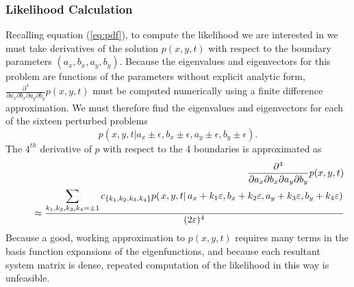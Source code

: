 \documentclass[10pt]{article}
\begin{document}
\subsubsection{Likelihood Calculation} \label{sec:likelihood-calc}
Recalling equation (\ref{eq:pdf}), to compute the likelihood we are
interested in we must take derivatives of the solution $p(x,y,t)$ with
respect to the boundary parameters $(a_x, b_x, a_y, b_y)$. Because the
eigenvalues and eigenvectors for this problem are functions of the
parameters without explicit analytic form,
$\frac{\partial^4}{\partial a_x\partial b_x \partial a_y \partial
  b_y}p(x,y,t)$ must be computed numerically using a finite difference
approximation. We must therefore find the eigenvalues and
eigenvectors for each of the sixteen perturbed problems
\[
  p(x,y,t | a_x \pm \epsilon, b_x \pm \epsilon, a_y \pm \epsilon, b_y \pm \epsilon).
\]
The $4^{th}$ derivative of $p$ with respect to the 4 boundaries is
approximated as
\begin{eqnarray*} 
& & \frac{\partial^4}{\partial a_x \partial b_x \partial a_y \partial b_y} p(x, y, t) 
\nonumber \\
& & \hspace*{0.5cm} \approx \frac{\displaystyle \sum_{k_1, k_2, k_3, k_4 = \pm 1}
c_{\{ k_1, k_2, k_3, k_4 \} } p(\left. x, y, t \right| a_x+k_1 \varepsilon, b_x+k_2 \varepsilon, 
a_y+k_3 \varepsilon, b_y+k_4 \varepsilon) }{(2 \varepsilon )^4} 
\nonumber
\end{eqnarray*}
Because a good, working approximation to $p(x,y,t)$ requires many
terms in the basis function expansions of the eigenfunctions, and
because each resultant system matrix is dense, repeated computation of
the likelihood in this way is unfeasible.
\end{document}
